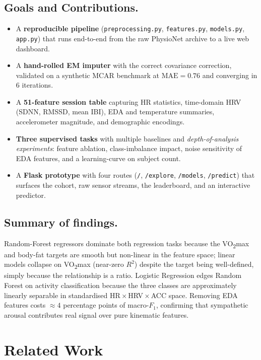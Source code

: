 \documentclass[sigconf,nonacm]{acmart}
\begin{document}
\subsection{Goals and Contributions.}
\begin{itemize}
    \item A \textbf{reproducible pipeline} (\texttt{preprocessing.py},
    \texttt{features.py}, \texttt{models.py}, \texttt{app.py}) that
    runs end-to-end from the raw PhysioNet archive to a live web
    dashboard.
    \item A \textbf{hand-rolled EM imputer} with the correct
    covariance correction, validated on a synthetic MCAR benchmark
    at $\mathrm{MAE}=0.76$ and converging in 6 iterations.
    \item A \textbf{51-feature session table} capturing HR statistics,
    time-domain HRV (SDNN, RMSSD, mean IBI), EDA and temperature
    summaries, accelerometer magnitude, and demographic encodings.
    \item \textbf{Three supervised tasks} with multiple baselines
    and \emph{depth-of-analysis experiments}: feature ablation,
    class-imbalance impact, noise sensitivity of EDA features, and
    a learning-curve on subject count.
    \item A \textbf{Flask prototype} with four routes
    (\texttt{/}, \texttt{/explore}, \texttt{/models}, \texttt{/predict})
    that surfaces the cohort, raw sensor streams, the leaderboard,
    and an interactive predictor.
\end{itemize}

\subsection{Summary of findings.}
Random-Forest regressors dominate both regression tasks because the
VO\textsubscript{2}max and body-fat targets are smooth but non-linear
in the feature space; linear models collapse on VO\textsubscript{2}max
(near-zero $R^{2}$) despite the target being well-defined, simply
because the relationship is a ratio. Logistic Regression edges
Random Forest on activity classification because the three classes
are approximately linearly separable in standardised HR\,$\times$\,HRV\,$\times$\,ACC
space. Removing EDA features costs $\approx 4$ percentage points of
macro-$F_{1}$, confirming that sympathetic arousal contributes real
signal over pure kinematic features.

\section{Related Work}
\label{sec:related}
\end{document}

